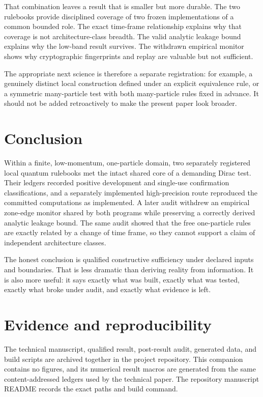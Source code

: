 \documentclass[11pt]{article}
\begin{document}
That combination leaves a result that is smaller but more durable.  The two
rulebooks provide disciplined coverage of two frozen implementations of a
common bounded role.  The exact time-frame relationship explains why that
coverage is not architecture-class breadth.  The valid analytic leakage bound
explains why the low-band result survives.  The withdrawn empirical monitor
shows why cryptographic fingerprints and replay are valuable but not
sufficient.

The appropriate next science is therefore a separate registration: for
example, a genuinely distinct local construction defined under an explicit
equivalence rule, or a symmetric many-particle test with both many-particle rules
fixed in advance.  It should not be added retroactively to make the present
paper look broader.

\section{Conclusion}

Within a finite, low-momentum, one-particle domain, two separately registered
local quantum rulebooks met the intact shared core of a demanding Dirac test.
Their ledgers recorded positive development and single-use confirmation
classifications, and a separately implemented high-precision route reproduced
the committed computations as implemented.  A later audit withdrew an
empirical zone-edge
monitor shared by both programs while preserving a correctly derived analytic
leakage bound.  The same audit showed that the free one-particle rules are
exactly related by a change of time frame, so they cannot support a claim of
independent architecture classes.

The honest conclusion is qualified constructive sufficiency under declared
inputs and boundaries.  That is less dramatic than deriving reality from
information.  It is also more useful: it says exactly what was built, exactly
what was tested, exactly what broke under audit, and exactly what evidence is
left.

\section*{Evidence and reproducibility}

The technical manuscript, qualified result, post-result audit, generated data,
and build scripts are archived together in the project repository.  This
companion contains no figures, and its numerical result macros are generated
from the same content-addressed ledgers used by the technical paper.  The
repository manuscript README records the exact paths and build command.



\end{document}
